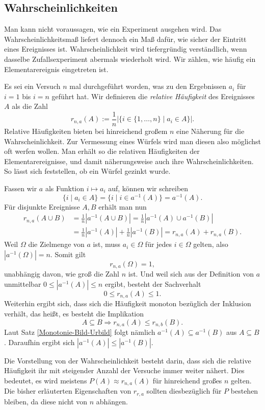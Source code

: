 \subsection{Wahrscheinlichkeiten}

Man kann nicht voraussagen, wie ein Experiment ausgehen wird. Das
Wahrscheinlichkeitsmaß liefert dennoch ein Maß dafür, wie sicher der
Eintritt eines Ereignisses ist. Wahrscheinlichkeit wird tiefergründig
verständlich, wenn dasselbe Zufallsexperiment abermals wiederholt wird.
Wir zählen, wie häufig ein Elementarereignis eingetreten ist.

Es sei ein Versuch $n$ mal durchgeführt worden, was zu den Ergebnissen
$a_i$ für $i=1$ bis $i=n$ geführt hat. Wir definieren die \emph{relative
Häufigkeit} des Ereignisses $A$ als die Zahl
\[r_{n,a}(A) := \frac{1}{n}|\{i\in\{1,\ldots,n\}\mid a_i\in A\}|.\]
Relative Häufigkeiten bieten bei hinreichend großem $n$ eine Näherung
für die Wahrscheinlichkeit. Zur Vermessung eines Würfels wird man
diesen also möglichst oft werfen wollen. Man erhält so die relativen
Häufigkeiten der Elementarereignisse, und damit näherungsweise auch
ihre Wahrscheinlichkeiten. So lässt sich feststellen, ob ein
Würfel gezinkt wurde.

Fassen wir $a$ als Funktion $i\mapsto a_i$ auf, können wir schreiben
\[\{i\mid a_i\in A\} = \{i\mid i\in a^{-1}(A)\} = a^{-1}(A).\]
Für disjunkte Ereignisse $A,B$ erhält man nun
\begin{align*}
r_{n,a}(A\cup B) &= \tfrac{1}{n}|a^{-1}(A\cup B)|
= \tfrac{1}{n}|a^{-1}(A)\cup a^{-1}(B)|\\
&= \tfrac{1}{n}|a^{-1}(A)| + \tfrac{1}{n}|a^{-1}(B)|
= r_{n,a}(A) + r_{n,a}(B).
\end{align*}
Weil $\Omega$ die Zielmenge von $a$ ist, muss $a_i\in\Omega$
für jedes $i\in\Omega$ gelten, also $|a^{-1}(\Omega)|=n$. Somit gilt
\[r_{n,a}(\Omega) = 1,\]
unabhängig davon, wie groß die Zahl $n$ ist. Und weil sich aus der
Definition von $a$ unmittelbar $0\le |a^{-1}(A)|\le n$ ergibt, besteht der
Sachverhalt
\[0\le r_{n,a}(A)\le 1.\]
Weiterhin ergibt sich, dass sich die Häufigkeit monoton bezüglich der
Inklusion verhält, das heißt, es besteht die Implikation
\[A\subseteq B\Rightarrow r_{n,a}(A)\le r_{n,b}(B).\]
Laut Satz \ref{Monotonie-Bild-Urbild} folgt nämlich $a^{-1}(A)\subseteq a^{-1}(B)$
aus $A\subseteq B$. Daraufhin ergibt sich $|a^{-1}(A)|\le |a^{-1}(B)|$.

Die Vorstellung von der Wahrscheinlichkeit besteht darin, dass sich
die relative Häufigkeit ihr mit steigender Anzahl der Versuche immer
weiter nähert. Dies bedeutet, es wird meistens $P(A)\approx r_{n,a}(A)$
für hinreichend großes $n$ gelten. Die bisher erläuterten Eigenschaften
von $r_{r,a}$ sollten diesbezüglich für $P$ bestehen bleiben, da diese
nicht von $n$ abhängen.

